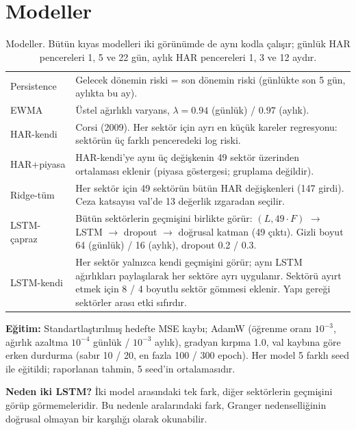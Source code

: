 \documentclass[11pt,a4paper]{article}
\begin{document}
\section{Modeller}
\begin{table}[H]
\centering\small
\caption{Modeller. Bütün kıyas modelleri iki görünümde de aynı kodla çalışır; günlük HAR pencereleri 1, 5 ve 22 gün,
aylık HAR pencereleri 1, 3 ve 12 aydır.}
\label{tab:models}
\begin{tabular}{@{}lp{12.4cm}@{}}
\toprule
Persistence & Gelecek dönemin riski = son dönemin riski (günlükte son 5 gün, aylıkta bu ay). \\
EWMA & Üstel ağırlıklı varyans, $\lambda = 0.94$ (günlük) / $0.97$ (aylık). \\
HAR-kendi & Corsi (2009). Her sektör için ayrı en küçük kareler regresyonu: sektörün üç farklı penceredeki log riski. \\
HAR+piyasa & HAR-kendi'ye aynı üç değişkenin 49 sektör üzerinden ortalaması eklenir (piyasa göstergesi; gruplama değildir). \\
Ridge-tüm & Her sektör için 49 sektörün bütün HAR değişkenleri (147 girdi). Ceza katsayısı val'de 13 değerlik ızgaradan seçilir. \\
\midrule
LSTM-çapraz & Bütün sektörlerin geçmişini birlikte görür: $(L, 49{\cdot}F)$ $\to$ LSTM $\to$ dropout $\to$ doğrusal katman (49 çıktı).
              Gizli boyut 64 (günlük) / 16 (aylık), dropout 0.2 / 0.3. \\
LSTM-kendi & Her sektör yalnızca kendi geçmişini görür; aynı LSTM ağırlıkları paylaşılarak her sektöre ayrı uygulanır.
             Sektörü ayırt etmek için 8 / 4 boyutlu sektör gömmesi eklenir. Yapı gereği sektörler arası etki sıfırdır. \\
\bottomrule
\end{tabular}
\end{table}

\noindent
\textbf{Eğitim:} Standartlaştırılmış hedefte MSE kaybı; AdamW (öğrenme oranı $10^{-3}$, ağırlık azaltma $10^{-4}$ günlük /
$10^{-3}$ aylık), gradyan kırpma 1.0, val kaybına göre erken durdurma (sabır 10 / 20, en fazla 100 / 300 epoch).
Her model 5 farklı seed ile eğitildi; raporlanan tahmin, 5 seed'in ortalamasıdır.

\noindent
\textbf{Neden iki LSTM?} İki model arasındaki tek fark, diğer sektörlerin geçmişini görüp görmemeleridir.
Bu nedenle aralarındaki fark, Granger nedenselliğinin doğrusal olmayan bir karşılığı olarak okunabilir.

\end{document}
